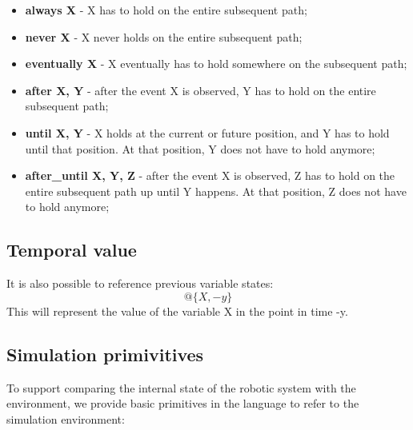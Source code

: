 \begin{itemize}
\item {\bfseries always X} - X has to hold on the entire subsequent path;
\item {\bfseries never X} - X never holds on the entire subsequent path;
\item {\bfseries eventually X} - X eventually has to hold somewhere on the subsequent path;
\item {\bfseries after X, Y} - after the event X is observed, Y has to hold on the entire subsequent path;
\item {\bfseries until X, Y} - X holds at the current or future position, and Y has to hold until that position. At that position, Y does not have to hold anymore;
\item {\bfseries after\_until X, Y, Z} - after the event X is observed, Z has to hold on the entire subsequent path up until Y happens. At that position, Z does not have to hold anymore;
\end{itemize}


\subsection{Temporal value}

It is also possible to reference previous variable states:
\begin{equation}
@\{X, -y\}
\end{equation}
This will represent the value of the variable X in the point in time -y.

\subsection{Simulation primivitives}

To support comparing the internal state of the robotic system with the environment, we provide basic primitives in the language to refer to the simulation environment:

